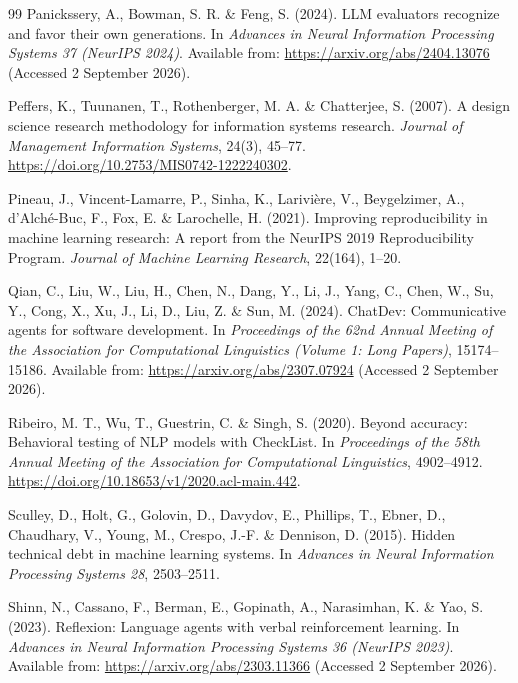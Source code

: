 \begin{thebibliography}{99}
Panickssery, A., Bowman, S. R. \& Feng, S. (2024).
LLM evaluators recognize and favor their own generations.
In \emph{Advances in Neural Information Processing Systems 37 (NeurIPS 2024)}.
Available from: \url{https://arxiv.org/abs/2404.13076} (Accessed 2 September 2026).

Peffers, K., Tuunanen, T., Rothenberger, M. A. \& Chatterjee, S. (2007).
A design science research methodology for information systems research.
\emph{Journal of Management Information Systems}, 24(3), 45--77.
\url{https://doi.org/10.2753/MIS0742-1222240302}.

Pineau, J., Vincent-Lamarre, P., Sinha, K., Larivi\`ere, V., Beygelzimer, A.,
d'Alch\'{e}-Buc, F., Fox, E. \& Larochelle, H. (2021).
Improving reproducibility in machine learning research: A report from the NeurIPS 2019
Reproducibility Program. \emph{Journal of Machine Learning Research}, 22(164), 1--20.

Qian, C., Liu, W., Liu, H., Chen, N., Dang, Y., Li, J., Yang, C., Chen, W., Su, Y., Cong, X.,
Xu, J., Li, D., Liu, Z. \& Sun, M. (2024).
ChatDev: Communicative agents for software development.
In \emph{Proceedings of the 62nd Annual Meeting of the Association for Computational Linguistics
(Volume 1: Long Papers)}, 15174--15186.
Available from: \url{https://arxiv.org/abs/2307.07924} (Accessed 2 September 2026).

Ribeiro, M. T., Wu, T., Guestrin, C. \& Singh, S. (2020).
Beyond accuracy: Behavioral testing of NLP models with CheckList.
In \emph{Proceedings of the 58th Annual Meeting of the Association for Computational Linguistics},
4902--4912. \url{https://doi.org/10.18653/v1/2020.acl-main.442}.

Sculley, D., Holt, G., Golovin, D., Davydov, E., Phillips, T., Ebner, D., Chaudhary, V., Young, M.,
Crespo, J.-F. \& Dennison, D. (2015).
Hidden technical debt in machine learning systems.
In \emph{Advances in Neural Information Processing Systems 28}, 2503--2511.

Shinn, N., Cassano, F., Berman, E., Gopinath, A., Narasimhan, K. \& Yao, S. (2023).
Reflexion: Language agents with verbal reinforcement learning.
In \emph{Advances in Neural Information Processing Systems 36 (NeurIPS 2023)}.
Available from: \url{https://arxiv.org/abs/2303.11366} (Accessed 2 September 2026).


\end{thebibliography}
